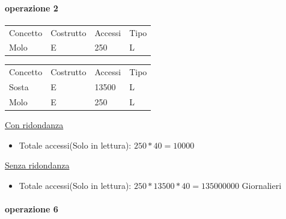 \paragraph{operazione 2}

\begin{center}
    \begin{minipage}{.48\linewidth}
        \begin{tabularx}{\linewidth}{|X|l|l|l|}
            \hline
            \rowcolor{gray!30}
            \multicolumn{4}{|c|}{\textbf{Con ridondanza}}\\
            \hline
            \rowcolor{gray!15}
            Concetto & Costrutto & Accessi & Tipo\\
            \hline
            Molo & E & 250 & L\\
            \hline
        \end{tabularx}
    \end{minipage}
    \begin{minipage}{.48\linewidth}
        \begin{tabularx}{\linewidth}{|X|l|l|l|}
            \hline
            \rowcolor{gray!30}
            \multicolumn{4}{|c|}{\textbf{Senza ridondanza}}\\
            \hline
            \rowcolor{gray!15}
            Concetto & Costrutto & Accessi & Tipo\\
            \hline
            Sosta & E & 13500 & L\\
            \hline
            Molo & E & 250 & L\\
            \hline
        \end{tabularx}
    \end{minipage}
\end{center}

\underline{Con ridondanza}
\begin{itemize}
    \item Totale accessi(Solo in lettura): $250*40 = 10000$
\end{itemize}
\underline{Senza ridondanza}
\begin{itemize}
    \item Totale accessi(Solo in lettura): $250*13500*40 = 135000000$ Giornalieri
\end{itemize}

\paragraph{operazione 6}

